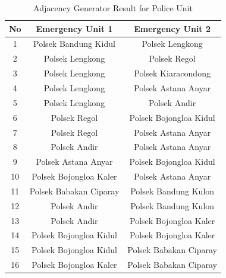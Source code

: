 \begin{table}[H]
\centering
\begin{tabular}{|c|c|c|}
\hline
\textbf{No} & \textbf{Emergency Unit 1} & \textbf{Emergency Unit 2} \\ \hline
1           & Polsek Bandung Kidul      & Polsek Lengkong           \\ \hline
2           & Polsek Lengkong           & Polsek Regol              \\ \hline
3           & Polsek Lengkong           & Polsek Kiaracondong       \\ \hline
4           & Polsek Lengkong           & Polsek Astana Anyar       \\ \hline
5           & Polsek Lengkong           & Polsek Andir              \\ \hline
6           & Polsek Regol              & Polsek Bojongloa Kidul    \\ \hline
7           & Polsek Regol              & Polsek Astana Anyar       \\ \hline
8           & Polsek Andir              & Polsek Astana Anyar       \\ \hline
9           & Polsek Astana Anyar       & Polsek Bojongloa Kidul    \\ \hline
10          & Polsek Bojongloa Kaler    & Polsek Astana Anyar       \\ \hline
11          & Polsek Babakan Ciparay    & Polsek Bandung Kulon      \\ \hline
12          & Polsek Andir              & Polsek Bandung Kulon      \\ \hline
13          & Polsek Andir              & Polsek Bojongloa Kaler    \\ \hline
14          & Polsek Bojongloa Kidul    & Polsek Bojongloa Kaler    \\ \hline
15          & Polsek Bojongloa Kidul    & Polsek Babakan Ciparay    \\ \hline
16          & Polsek Bojongloa Kaler    & Polsek Babakan Ciparay    \\ \hline
\end{tabular}
\caption{Adjacency Generator Result for Police Unit}
\label{table:adj_pol}
\end{table}

\pagebreak



